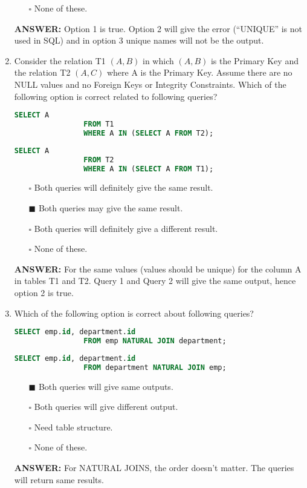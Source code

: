 \documentclass[10pt]{article}
\begin{document}
\begin{enumerate}
\begin{enumerate}
				\item[$\square$] None of these.
			\end{enumerate}
			\color{red} \textbf{ANSWER:} \color{black} Option 1 is true. Option 2 will give the error (“UNIQUE” is not used in SQL) and in option 3 unique names will not be the output.

		\item Consider the relation T1 $(A,B)$ in which $(A,B)$ is the Primary Key and the relation T2 $(A,C)$ where A is the Primary Key. Assume there are no NULL values and no Foreign Keys or Integrity Constraints. Which of the following option is correct related to following queries?
			\begin{lstlisting}[language=SQL,firstline=1, lastline=3] 
				SELECT A 
				FROM T1 
				WHERE A IN (SELECT A FROM T2);
			\end{lstlisting}
			\begin{lstlisting}[language=SQL,firstline=1, lastline=3] 
				SELECT A 
				FROM T2 
				WHERE A IN (SELECT A FROM T1);
			\end{lstlisting}

			\begin{enumerate}
				\item[$\square$] Both queries will definitely give the same result.
				\item[$\blacksquare$] Both queries may give the same result.
				\item[$\square$] Both queries will definitely give a different result.
				\item[$\square$] None of these.
			\end{enumerate}
			\color{red} \textbf{ANSWER:} \color{black} For the same values (values should be unique) for the column A in tables T1 and T2. Query 1 and Query 2 will give the same output, hence option 2 is true.

		\item Which of the following option is correct about following queries?
			\begin{lstlisting}[language=SQL,firstline=1, lastline=2] 
				SELECT emp.id, department.id 
				FROM emp NATURAL JOIN department;
			\end{lstlisting}
			\begin{lstlisting}[language=SQL,firstline=1, lastline=2] 
				SELECT emp.id, department.id 
				FROM department NATURAL JOIN emp;
			\end{lstlisting}
			\begin{enumerate}
				\item[$\blacksquare$] Both queries will give same outputs.
				\item[$\square$] Both queries will give different output.
				\item[$\square$] Need table structure.
				\item[$\square$] None of these.
			\end{enumerate}
			\color{red} \textbf{ANSWER:} \color{black} For NATURAL JOINS, the order doesn’t matter. The queries will return same results.


\end{enumerate}
\end{document}
